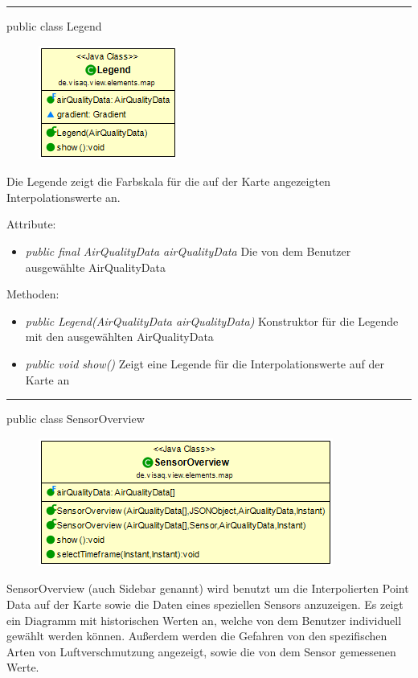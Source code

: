\clearpage %

\rule{\textwidth}{0.4pt}
public class Legend

\begin{minipage}{0.3\textwidth}
    \begin{figure}[H]
        \includegraphics[scale = 0.6]{media/frontend/view/de.view.elements.map/Legend_Class.png}
    \end{figure}
    \end{minipage} \hfill
    \begin{minipage}{0.6\textwidth}
Die Legende zeigt die Farbskala für die auf der Karte angezeigten Interpolationswerte an.
\end{minipage}

Attribute:
\begin{itemize}
    \item \emph{public final AirQualityData airQualityData} Die von dem Benutzer ausgewählte AirQualityData
\end{itemize}
Methoden:
\begin{itemize}
    \item \emph{public Legend(AirQualityData airQualityData)} Konstruktor für die Legende mit den ausgewählten AirQualityData
    \item \emph{public void show()} Zeigt eine Legende für die Interpolationswerte auf der Karte an
\end{itemize}
\clearpage %
\rule{\textwidth}{0.4pt}
public class SensorOverview

\begin{minipage}{0.4\textwidth}
    \begin{figure}[H]
        \includegraphics[scale = 0.5]{media/frontend/view/de.view.elements.map/SensorOverview_Class.png}
    \end{figure}
    \end{minipage} \hfill
    \begin{minipage}{0.4\textwidth}
SensorOverview (auch Sidebar genannt) wird benutzt um die Interpolierten Point Data auf der Karte sowie die Daten eines speziellen Sensors anzuzeigen. Es zeigt ein Diagramm mit historischen Werten an, welche von dem Benutzer individuell gewählt werden können. Außerdem werden die Gefahren von den spezifischen Arten von Luftverschmutzung angezeigt, sowie die von dem Sensor gemessenen Werte.
\end{minipage}

